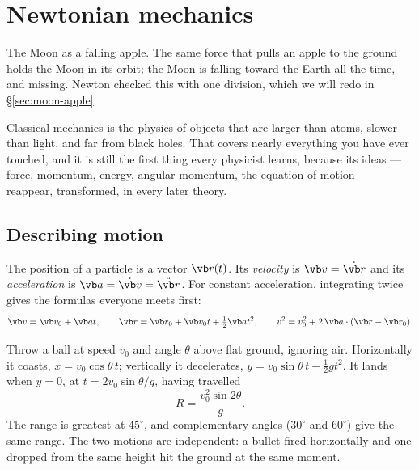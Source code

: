 \chapter{Newtonian mechanics}
\label{ch:newton}



\begin{prototype}
The Moon as a falling apple. The same force that pulls an apple to the ground holds the Moon in its orbit; the Moon is falling toward the Earth all the time, and missing. Newton checked this with one division, which we will redo in \S\ref{sec:moon-apple}.
\end{prototype}

Classical mechanics is the physics of objects that are larger than atoms, slower than light, and far from black holes. That covers nearly everything you have ever touched, and it is still the first thing every physicist learns, because its ideas --- force, momentum, energy, angular momentum, the equation of motion --- reappear, transformed, in every later theory.

\section{Describing motion}

The position of a particle is a vector $\vb r(t)$. Its \emph{velocity} is $\vb v = \dot{\vb r}$ and its \emph{acceleration} is $\vb a = \dot{\vb v} = \ddot{\vb r}$. For constant acceleration, integrating twice gives the formulas everyone meets first:
\[
  \vb v = \vb v_0 + \vb a t, \qquad \vb r = \vb r_0 + \vb v_0 t + \tfrac12 \vb a t^{2}, \qquad v^2 = v_0^2 + 2\,\vb a\cdot(\vb r-\vb r_0).
\]

\begin{example}[Projectiles]
Throw a ball at speed $v_0$ and angle $\theta$ above flat ground, ignoring air. Horizontally it coasts, $x = v_0\cos\theta\,t$; vertically it decelerates, $y = v_0\sin\theta\,t - \tfrac12 gt^2$. It lands when $y=0$, at $t = 2v_0\sin\theta/g$, having travelled
\[
  R = \frac{v_0^2\sin 2\theta}{g}.
\]
The range is greatest at $45^\circ$, and complementary angles ($30^\circ$ and $60^\circ$) give the same range. The two motions are independent: a bullet fired horizontally and one dropped from the same height hit the ground at the same moment.
\end{example}


